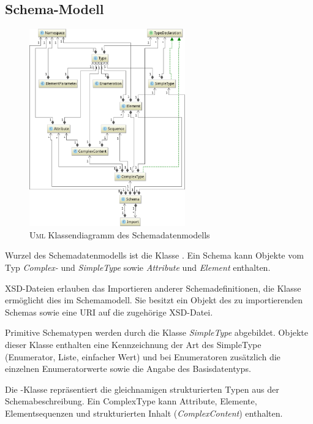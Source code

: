 \subsection{Schema-Modell}
\label{sec:schema_model}

\begin{figure}[t]
    \centering
    \includegraphics[width=0.6\textwidth]{resources/typemodel}
    \caption{\textsc{Uml} Klassendiagramm des Schemadatenmodells}
    \label{fig:schema_model}
\end{figure}

Wurzel des Schemadatenmodells ist die Klasse . Ein Schema kann Objekte vom Typ \emph{Complex-} und \emph{SimpleType} sowie \emph{Attribute} und \emph{Element} enthalten.

\gls{XSD}-Dateien erlauben das Importieren anderer Schemadefinitionen, die Klasse  ermöglicht dies im Schemamodell. Sie besitzt ein Objekt des zu importierenden Schemas sowie eine \gls{URI} auf die zugehörige \gls{XSD}-Datei.

Primitive Schematypen werden durch die Klasse \emph{SimpleType} abgebildet. Objekte dieser Klasse enthalten eine Kennzeichnung der Art des SimpleType (Enumerator, Liste, einfacher Wert) und bei Enumeratoren zusätzlich die einzelnen Enumeratorwerte sowie die Angabe des Basisdatentyps.

Die -Klasse repräsentiert die gleichnamigen strukturierten Typen aus der Schemabeschreibung. 
Ein ComplexType kann Attribute, Elemente, Elementsequenzen und strukturierten Inhalt (\emph{ComplexContent}) enthalten.

